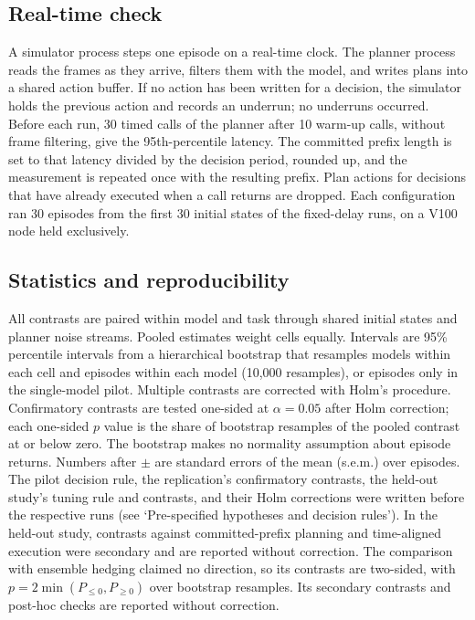 \documentclass[pdflatex,sn-nature]{sn-jnl}%
\begin{document}
\subsection{Real-time check}\label{app:realtime}

A simulator process steps one episode on a real-time clock. The planner process reads the frames as they arrive, filters them with the model, and writes plans into a shared action buffer. If no action has been written for a decision, the simulator holds the previous action and records an underrun; no underruns occurred. Before each run, 30 timed calls of the planner after 10 warm-up calls, without frame filtering, give the 95th-percentile latency. The committed prefix length is set to that latency divided by the decision period, rounded up, and the measurement is repeated once with the resulting prefix. Plan actions for decisions that have already executed when a call returns are dropped. Each configuration ran 30 episodes from the first 30 initial states of the fixed-delay runs, on a V100 node held exclusively.

\subsection{Statistics and reproducibility}\label{sec:stats}

All contrasts are paired within model and task through shared initial states and planner noise streams. Pooled estimates weight cells equally. Intervals are 95\% percentile intervals from a hierarchical bootstrap\cite{efron1993bootstrap} that resamples models within each cell and episodes within each model (10,000 resamples), or episodes only in the single-model pilot. Multiple contrasts are corrected with Holm's procedure\cite{holm1979simple}. Confirmatory contrasts are tested one-sided at $\alpha=0.05$ after Holm correction; each one-sided $p$ value is the share of bootstrap resamples of the pooled contrast at or below zero. The bootstrap makes no normality assumption about episode returns. Numbers after $\pm$ are standard errors of the mean (s.e.m.) over episodes. The pilot decision rule, the replication's confirmatory contrasts, the held-out study's tuning rule and contrasts, and their Holm corrections were written before the respective runs (see `Pre-specified hypotheses and decision rules'). In the held-out study, contrasts against committed-prefix planning and time-aligned execution were secondary and are reported without correction. The comparison with ensemble hedging claimed no direction, so its contrasts are two-sided, with $p=2\min(P_{\le 0}, P_{\ge 0})$ over bootstrap resamples. Its secondary contrasts and post-hoc checks are reported without correction.
\end{document}
